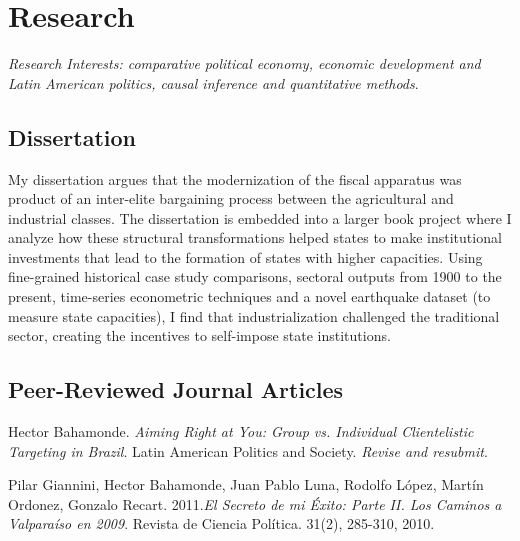 \documentclass[letterpaper]{article}
\renewenvironment{itemize}{
  \begin{list}{}{
    \setlength{\leftmargin}{1.5em}
  }
}{
  \end{list}
}
\begin{document}
%


\section*{Research}

\emph{Research Interests: comparative political economy, economic development and Latin American politics, causal inference and quantitative methods}.

\subsection*{Dissertation}

My dissertation argues that the modernization of the fiscal apparatus was product of an inter-elite bargaining process between the agricultural and industrial classes. The dissertation is embedded into a larger book project where I analyze how these structural transformations helped states to make institutional investments that lead to the formation of states with higher capacities. Using fine-grained historical case study comparisons, sectoral outputs from 1900 to the present, time-series econometric techniques and a novel earthquake dataset (to measure state capacities), I find that industrialization challenged the traditional sector, creating the incentives to self-impose state institutions.



\subsection*{Peer-Reviewed Journal Articles}

\begin{itemize}
\item Hector Bahamonde. \emph{Aiming Right at You: Group vs. Individual Clientelistic Targeting in Brazil}. Latin American Politics and Society. {\it Revise and resubmit}.
\item Pilar Giannini, Hector Bahamonde, Juan Pablo Luna, Rodolfo L\'opez, Mart\'in Ordonez, Gonzalo Recart. 2011.\emph{El Secreto de mi \'Exito: Parte II. Los Caminos a Valpara\'iso en 2009}. Revista de Ciencia Pol\'itica. 31(2), 285-310, 2010.
\end{itemize}
\end{document}
